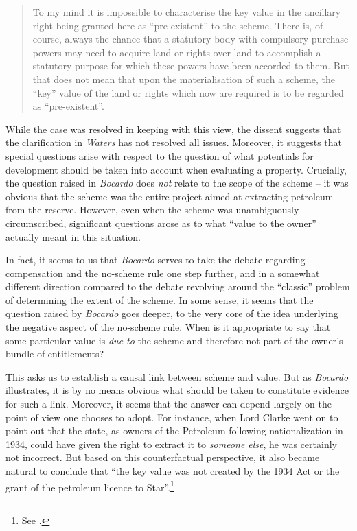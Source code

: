\begin{quote}To my mind it is impossible to characterise the key value in the ancillary
right being granted here as ``pre-existent'' to the scheme. There is, of course,
always the chance that a statutory body with compulsory purchase powers may
need to acquire land or rights over land to accomplish a statutory purpose for
which these powers have been accorded to them. But that does not mean that upon
the materialisation of such a scheme, the ``key'' value of the land or rights which
now are required is to be regarded as “pre-existent”.
\end{quote}

While the case was resolved in keeping with this view, the dissent suggests that the clarification in \emph{Waters} has not resolved all issues. Moreover, it suggests that special questions arise with respect to the question of what potentials for development should be taken into account when evaluating a property. Crucially, the question raised in \emph{Bocardo} does \emph{not} relate to the scope of the scheme -- it was obvious that the scheme was the entire project aimed at extracting petroleum from the reserve. However, even when the scheme was unambiguously circumscribed, significant questions arose as to what ``value to the owner'' actually meant in this situation. 

In fact, it seems to us that \emph{Bocardo} serves to take the debate regarding compensation and the no-scheme rule one step further, and in a somewhat different direction compared to the debate revolving around the ``classic'' problem of determining the extent of the scheme. In some sense, it seems that the question raised by \emph{Bocardo} goes deeper, to the very core of the idea underlying the negative aspect of the no-scheme rule. When is it appropriate to say that some particular value is \emph{due to} the scheme and therefore not part of the owner's bundle of entitlements?

This asks us to establish a causal link between scheme and value. But as \emph{Bocardo} illustrates, it is by no means obvious what should be taken to constitute evidence for such a link. Moreover, it seems that the answer can depend largely on the point of view one chooses to adopt. For instance, when Lord Clarke went on to point out that the state, as owners of the Petroleum following nationalization in 1934, could have given the right to extract it to \emph{someone else}, he was certainly not incorrect. But based on this counterfactual perspective, it also became natural to conclude that ``the key value was not created by the 1934 Act or the grant of the petroleum licence to Star''.\footnote{See \cite[163]{bocardo10}.} 

